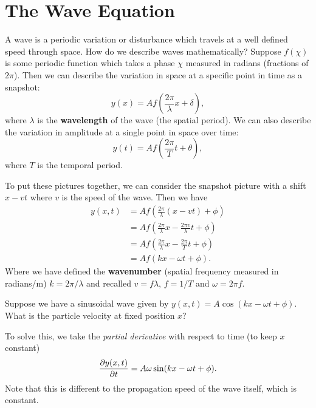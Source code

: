 \documentclass[../classical_mechanics.tex]{subfiles}
\begin{document}
    \section{The Wave Equation}\label{sec:the-wave-equation}
        A wave is a periodic variation or disturbance which travels at a well defined speed through space.
        How do we describe waves mathematically?
        Suppose $f(\chi)$ is some periodic function which takes a phase $\chi$ measured in radians (fractions of $2\pi$).
        Then we can describe the variation in space at a specific point in time as a snapshot:
        \begin{equation}
            y(x)=Af\left(\frac{2\pi}{\lambda}x+\delta\right),
        \end{equation}
        where $\lambda$ is the \textbf{wavelength} of the wave (the spatial period).
        We can also describe the variation in amplitude at a single point in space over time:
        \begin{equation}
            y(t)=Af\left(\frac{2\pi}{T}t+\theta\right),
        \end{equation}
        where $T$ is the temporal period.

        To put these pictures together, we can consider the snapshot picture with a shift $x-vt$ where $v$ is the speed of the wave.
        Then we have
        \begin{align}
            y(x,t)&=Af\left(\frac{2\pi}{\lambda}(x-vt)+\phi\right)\\
            &=Af\left(\frac{2\pi}{\lambda}x-\frac{2\pi v}{\lambda}t+\phi\right)\\
            &=Af\left(\frac{2\pi}{\lambda}x-\frac{2\pi}{T}t+\phi\right)\\
            &=Af(kx-\omega t+\phi).
        \end{align} 
        Where we have defined the \textbf{wavenumber} (spatial frequency measured in radians/m) $k=2\pi/\lambda$ and recalled $v=f\lambda$, $f=1/T$ and $\omega=2\pi f$.
        \begin{example}
            Suppose we have a sinusoidal wave given by $y(x,t)=A\cos(kx-\omega t+\phi)$.
            What is the particle velocity at fixed position $x$?

            To solve this, we take the \textit{partial derivative} with respect to time (to keep $x$ constant)
            \begin{equation}
                \pdv{y(x,t)}{t}=A\omega\sin(kx-\omega t+\phi).
            \end{equation}
            Note that this is different to the propagation speed of the wave itself, which is constant.
        \end{example}
\end{document}
